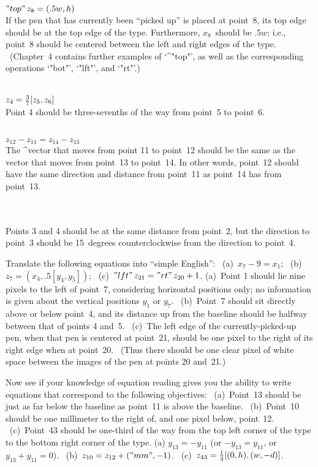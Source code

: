 {{{{\\$"top"\,z_8=(.5w,h)$\\
If the pen that has currently been ``picked up'' is placed at point~8,
its top edge should be at the top edge of the type. Furthermore,
$x_8$~should be $.5w$; i.e., point~8 should be centered between the
left and right edges of the type. \ (Chapter~4 contains further
examples of `^"top"', as well as the corresponding operations
`"bot"', `"lft"', and `"rt"'.)

\\$z_4={3\over7}[z_5,z_6]$\\
Point 4 should be three-sevenths of the way from point~5 to  point~6.

\\$z_{12}-z_{11}=z_{14}-z_{13}$\\
The ^{vector} that moves from point 11 to point~12 should be the same
as the vector that moves from point~13 to point~14. In other words,
point~12 should have the same direction and distance from point~11
as point~14 has from point~13.

\\\\
Points 3 and 4 should be at the same distance from point~2, but
the direction to point~3 should be 15~degrees counterclockwise from
the direction to point~4.

\exercise Translate the following equations into ``simple English'':
\ (a)~$x_7-9=x_1$; \ (b)~$z_7=(x_4,.5[y_4,y_5])$; \
(c)~$"lft"\,z_{21}="rt"\,z_{20}+1$.
\answer (a)~Point 1 should lie nine pixels to the left of point~7,
considering horizontal positions only; no information is given about the
vertical positions $y_1$ or $y_7$. \ (b)~Point~7 should sit directly
above or below point~4, and its distance up from the baseline should be
halfway between that of points 4 and~5. \ (c)~The left edge of the
currently-picked-up pen, when that pen is centered at point~21, should be
one pixel to the right of its right edge when at point~20. \ (Thus there
should be one clear pixel of white space between the images of the
pen at points 20 and~21.)

\exercise Now see if your knowledge of equation reading gives you the
ability to write equations that correspond to the following objectives:
\ (a)~Point~13 should be just as far below the baseline as point~11 is
above the baseline. \ (b)~Point~10 should be one millimeter to the right
of, and one pixel below, point~12. \ (c)~Point~43 should be one-third of
the way from the top left corner of the type to the bottom right corner
of the type.
\answer (a) $y_{13}=-y_{11}$ (or $-y_{13}=y_{11}$, or $y_{13}+y_{11}=0$).
\ (b)~$z_{10}=z_{12}+("mm",-1)$. \ (c)~$z_{43}={1\over3}[(0,h),(w,-d)]$.

}}}}
